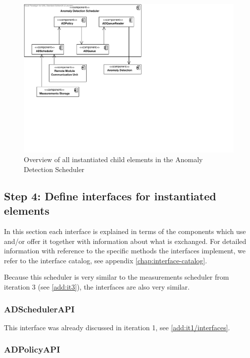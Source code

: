 \begin{figure}[H]
	\begin{centering}
		\includegraphics[width=\textwidth]{figs/add-it5-elements.pdf}
		\caption{Overview of all instantiated child elements in the Anomaly
		Detection Scheduler}
		\label{fig:it5/elements}
	\end{centering}
\end{figure}

\subsection{Step 4: Define interfaces for instantiated elements}
\label{add:it5/interfaces}

\npar In this section each interface is explained in terms of the components
which use and/or offer it together with information about what is exchanged. For
detailed information with reference to the specific methods the interfaces
implement, we refer to the interface catalog, see appendix
\ref{chap:interface-catalog}.

\npar Because this scheduler is very similar to the measurements scheduler from
iteration 3 (see \ref{add:it3}), the interfaces are also very similar.

\subsubsection{ADSchedulerAPI}

\npar This interface was already discussed in iteration 1, see
\ref{add:it1/interfaces}.

\subsubsection{ADPolicyAPI}

